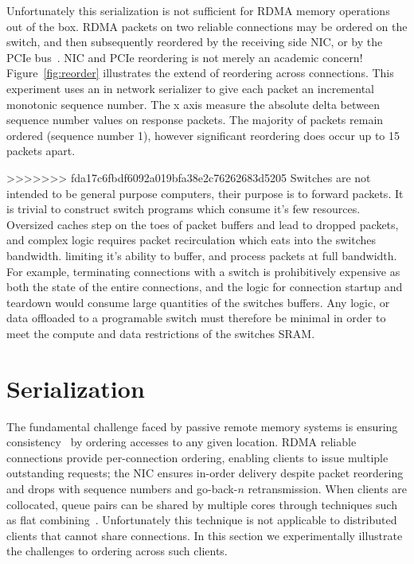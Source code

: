 Unfortunately this serialization is not sufficient for RDMA
memory operations out of the box. RDMA packets on two
reliable connections may be ordered on the switch, and then
subsequently reordered by the receiving side NIC, or by the
PCIe bus~\cite{understanding-pcie}. NIC and PCIe reordering
is not merely an academic concern!  Figure~\ref{fig:reorder}
illustrates the extend of reordering across connections.
This experiment uses an in network serializer to give each
packet an incremental monotonic sequence number. The x axis
measure the absolute delta between sequence number values on
response packets.  The majority of packets remain ordered
(sequence number 1), however significant reordering does
occur up to 15 packets apart.

>>>>>>> fda17c6fbdf6092a019bfa38e2c76262683d5205
Switches are not intended to be general purpose computers,
their purpose is to forward packets. It is trivial to
construct switch programs which consume it's few resources.
Oversized caches step on the toes of packet buffers and lead
to dropped packets, and complex logic requires packet
recirculation which eats into the switches bandwidth.
limiting it's ability to buffer, and process packets at full
bandwidth.
For example, terminating connections with a switch is
prohibitively expensive as both the state of the entire
connections, and the logic for connection startup and
teardown would consume large quantities of the switches
buffers. Any logic, or data offloaded to a programable
switch must therefore be minimal in order to meet the
compute and data restrictions of the switches SRAM.


\section{Serialization}

The fundamental challenge faced by passive remote memory systems is
ensuring consistency~\cite{ivy} by ordering accesses to any given
location.  RDMA reliable connections provide per-connection ordering,
enabling clients to
issue multiple outstanding requests; the NIC ensures in-order delivery despite 
packet reordering and drops with sequence numbers and go-back-$n$
retransmission.  When clients are collocated, queue pairs
can be shared by multiple cores through techniques such as
flat combining~\cite{flock,sherman}.
Unfortunately this technique is not applicable to
distributed clients that cannot share connections.
In this section we experimentally illustrate the challenges to
ordering across such clients.


